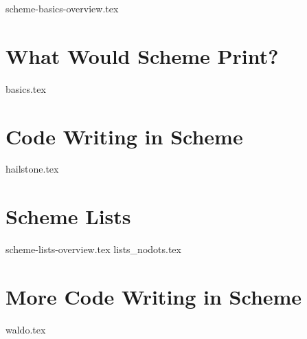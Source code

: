\documentclass{exam}
\begin{document}
{scheme-basics-overview.tex}
\begin{questions}
\newpage
\section{What Would Scheme Print?}
{basics.tex}

\section{Code Writing in Scheme}
{hailstone.tex}
\section{Scheme Lists}
{scheme-lists-overview.tex}
\newpage
{lists_nodots.tex}

\section{More Code Writing in Scheme}
{waldo.tex}
\end{questions}
\end{document}
